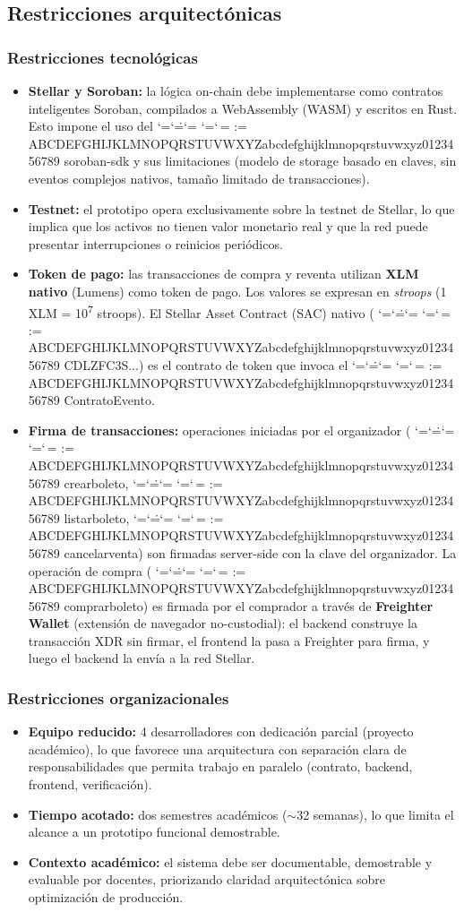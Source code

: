 \documentclass[12pt,oneside]{article}
\makeatletter
\def\ttbreak@uscore{\char95\penalty0\hskip0pt\relax}%
\def\ttbreak@actcat#1{\catcode`#1=\active}%
\def\ttbreak@chars{%
  \catcode`\/=\active \catcode`\.=\active \catcode`\:=\active
  \catcode`\-=\active \catcode`\,=\active
  \@tfor\ttbreak@c:=%
ABCDEFGHIJKLMNOPQRSTUVWXYZabcdefghijklmnopqrstuvwxyz0123456789\do{%
    \expandafter\ttbreak@actcat\ttbreak@c}%
  \let\_\ttbreak@uscore}%
\DeclareRobustCommand{\texttt}{\begingroup\ttfamily\ttbreak@chars\ttbreak@grab}
\def\ttbreak@grab#1{#1\endgroup}
\makeatother
\begin{document}
\subsection{Restricciones arquitectónicas}
\label{subsec:restricciones}

\subsubsection{Restricciones tecnológicas}

\begin{itemize}
  \item \textbf{Stellar y Soroban:} la lógica on-chain debe implementarse como contratos inteligentes Soroban, compilados a WebAssembly (WASM) y escritos en Rust. Esto impone el uso del \texttt{soroban-sdk} y sus limitaciones (modelo de storage basado en claves, sin eventos complejos nativos, tamaño limitado de transacciones).
  \item \textbf{Testnet:} el prototipo opera exclusivamente sobre la testnet de Stellar, lo que implica que los activos no tienen valor monetario real y que la red puede presentar interrupciones o reinicios periódicos.
  \item \textbf{Token de pago:} las transacciones de compra y reventa utilizan \textbf{XLM nativo} (Lumens) como token de pago. Los valores se expresan en \textit{stroops} (1 XLM = 10\textsuperscript{7} stroops). El Stellar Asset Contract (SAC) nativo (\texttt{CDLZFC3S...}) es el contrato de token que invoca el \texttt{ContratoEvento}.
  \item \textbf{Firma de transacciones:} operaciones iniciadas por el organizador (\texttt{crear\_boleto}, \texttt{listar\_boleto}, \texttt{cancelar\_venta}) son firmadas server-side con la clave del organizador. La operación de compra (\texttt{comprar\_boleto}) es firmada por el comprador a través de \textbf{Freighter Wallet} (extensión de navegador no-custodial): el backend construye la transacción XDR sin firmar, el frontend la pasa a Freighter para firma, y luego el backend la envía a la red Stellar.
\end{itemize}

\subsubsection{Restricciones organizacionales}

\begin{itemize}
  \item \textbf{Equipo reducido:} 4 desarrolladores con dedicación parcial (proyecto académico), lo que favorece una arquitectura con separación clara de responsabilidades que permita trabajo en paralelo (contrato, backend, frontend, verificación).
  \item \textbf{Tiempo acotado:} dos semestres académicos ($\sim$32 semanas), lo que limita el alcance a un prototipo funcional demostrable.
  \item \textbf{Contexto académico:} el sistema debe ser documentable, demostrable y evaluable por docentes, priorizando claridad arquitectónica sobre optimización de producción.
\end{itemize}
\end{document}
